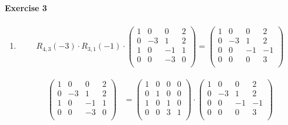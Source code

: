 \documentclass{article}
\begin{document}
\paragraph{Exercise 3}

\begin{enumerate}
    \item \begin{align*}
        R_{4,3}(-3) \cdot
        R_{3,1}(-1) \cdot 
        \begin{pmatrix}
            1 & 0 & 0 & 2 \\
            0 & -3 & 1 & 2 \\
            1 & 0 & -1 & 1 \\
            0 & 0 & -3 & 0 \\
        \end{pmatrix} = \begin{pmatrix}
            1 & 0 & 0 & 2 \\
            0 & -3 & 1 & 2 \\
            0 & 0 & -1 & -1 \\
            0 & 0 & 0 & 3 \\
        \end{pmatrix}
    \end{align*}

    \begin{align*}
        \begin{pmatrix}
            1 & 0 & 0 & 2 \\
            0 & -3 & 1 & 2 \\
            1 & 0 & -1 & 1 \\
            0 & 0 & -3 & 0 \\
        \end{pmatrix}
        &= 
        \begin{pmatrix}
            1 & 0 & 0 & 0 \\
            0 & 1 & 0 & 0 \\
            1 & 0 & 1 & 0 \\
            0 & 0 & 3 & 1 \\
        \end{pmatrix} \cdot 
        \begin{pmatrix}
            1 & 0 & 0 & 2 \\
            0 & -3 & 1 & 2 \\
            0 & 0 & -1 & -1 \\
            0 & 0 & 0 & 3 \\
        \end{pmatrix}
    \end{align*}


\end{enumerate}
\end{document}
